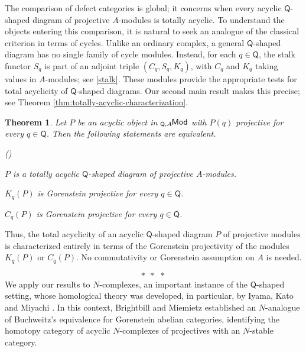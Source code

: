 \documentclass{amsart}
\newtheorem{intthm}{Theorem}[]
\theoremstyle{bfupright head,slanted body}
\theoremstyle{bfupright head,upright body}
\theoremstyle{fixed bf head,slanted body}
\theoremstyle{fixed bf head,upright body}
\theoremstyle{numbered paragraph}
\newlength{\thmlistleft}        %
\newlength{\thmlistright}       %
\newlength{\thmlistpartopsep}   %
\newlength{\thmlisttopsep}      %
\newlength{\thmlistparsep}      %
\newlength{\thmlistitemsep}     %
\newcounter{eqc}
\newenvironment{eqc}{\begin{list}{\upshape (\textit{\roman{eqc}})}%
		{\usecounter{eqc}%
			\setlength{\leftmargin}{\thmlistleft}%
			\setlength{\labelwidth}{\thmlistleft}%
			\setlength{\rightmargin}{\thmlistright}%
			\setlength{\partopsep}{\thmlistpartopsep}%
			\setlength{\topsep}{\thmlisttopsep}%
			\setlength{\parsep}{\thmlistparsep}%
			\setlength{\itemsep}{\thmlistitemsep}}}%
	{\end{list}}%
\numberwithin{equation}{res}
\newcommand{\Q}{\mathsf{Q}}
\newcommand{\lMod}[1]{{}_{#1}\mspace{-1mu}{\sf{Mod}}}
\begin{document}
The comparison of defect categories is global; it concerns when every acyclic $\Q$-shaped diagram of projective $A$-modules is totally acyclic. To understand the objects entering this comparison, it is natural to seek an analogue of the classical criterion in terms of cycles. Unlike an ordinary complex, a general $\Q$-shaped diagram has no single family of cycle modules. Instead, for each $q\in\Q$, the stalk functor $S_q$ is part of an adjoint triple $(C_q, S_q, K_q)$, with $C_q$ and $K_q$ taking values in $A$-modules; see \ref{stalk}. These modules provide the appropriate tests for total acyclicity of $\Q$-shaped diagrams. Our second main result makes this
precise; see Theorem \ref{thm:totally-acyclic-characterization}.

\begin{intthm}\label{thmB}
Let $P$ be an acyclic object in $\lMod{\Q,A}$ with $P(q)$ projective for every $q\in\Q$. Then the following statements are equivalent.
\begin{eqc}
\item $P$ is a totally acyclic $\Q$-shaped diagram of projective
$A$-modules.
\item $K_q(P)$ is Gorenstein projective for every $q\in\Q$.
\item $C_q(P)$ is Gorenstein projective for every $q\in\Q$.
\end{eqc}
\end{intthm}

Thus, the total acyclicity of an acyclic $\Q$-shaped diagram $P$ of projective modules is characterized entirely in terms of the Gorenstein projectivity of the modules $K_q(P)$ or $C_q(P)$. No commutativity or Gorenstein assumption on $A$ is needed.

\begin{equation*}
  \ast \ \ \ast \ \ \ast
\end{equation*}
\noindent
We apply our results to $N$-complexes, an important instance of the $\Q$-shaped setting, whose homological theory was developed, in particular, by Iyama, Kato and Miyachi \cite{IKM17}. In this context, Brightbill and Miemietz \cite[Theorem 4.12]{BM24} established an $N$-analogue of Buchweitz's equivalence for Gorenstein abelian categories, identifying the homotopy category of acyclic $N$-complexes of projectives with an $N$-stable category.
\end{document}
